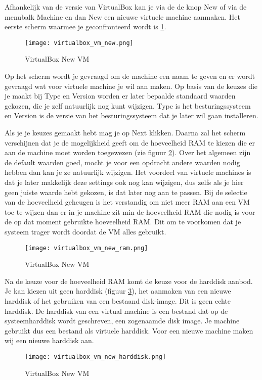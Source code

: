 Afhankelijk van de versie van VirtualBox kan je via de de knop New of via de menubalk Machine en dan New een nieuwe virtuele machine aanmaken. Het eerste scherm waarmee je geconfronteerd wordt is \ref{VB_New_VM}.
\begin{figure}[H]
	\centering
	\texttt{[image: virtualbox\_vm\_new.png]}
	\caption{VirtualBox New VM}
	\label{VB_New_VM}
\end{figure}
Op het scherm wordt je gevraagd om de machine een naam te geven en er wordt gevraagd wat voor virtuele machine je wil aan maken. Op basis van de keuzes die je maakt bij Type en Version worden er later bepaalde standaard waarden gekozen, die je zelf natuurlijk nog kunt wijzigen. Type is het besturingssysteem en Version is de versie van het besturingssysteem dat je later wil gaan installeren.

Als je je keuzes gemaakt hebt mag je op Next klikken. Daarna zal het scherm verschijnen dat je de mogelijkheid geeft om de hoeveelheid RAM te kiezen die er aan de machine moet worden toegewezen (zie figuur \ref{VB_New_VM_RAM}). Over het algemeen zijn de default waarden goed, mocht je voor een opdracht andere waarden nodig hebben dan kan je ze natuurlijk wijzigen. Het voordeel van virtuele machines is dat je later makkelijk deze settings ook nog kan wijzigen, dus zelfs als je hier geen juiste waarde hebt gekozen, is dat later nog aan te passen. Bij de selectie van de hoeveelheid geheugen is het verstandig om niet meer RAM aan een VM toe te wijzen dan er in je machine zit min de hoeveelheid RAM die nodig is voor de op dat moment gebruikte hoeveelheid RAM. Dit om te voorkomen dat je systeem trager wordt doordat de VM alles gebruikt.

\begin{figure}[H]
	\centering
	\texttt{[image: virtualbox\_vm\_new\_ram.png]}
	\caption{VirtualBox New VM}
	\label{VB_New_VM_RAM}
\end{figure}

Na de keuze voor de hoeveelheid RAM komt de keuze voor de harddisk aanbod. Je kan kiezen uit geen harddisk (figuur \ref{VB_New_VM_HD}), het aanmaken van een nieuwe harddisk of het gebruiken van een bestaand disk-image. Dit is geen echte harddisk. De harddisk van een virtual machine is een bestand dat op de systeemharddisk wordt geschreven, een zogenaamde disk image. Je machine gebruikt dus een bestand als virtuele harddisk. Voor een nieuwe machine maken wij een nieuwe harddisk aan.

\begin{figure}[H]
	\centering
	\texttt{[image: virtualbox\_vm\_new\_harddisk.png]}
	\caption{VirtualBox New VM}
	\label{VB_New_VM_HD}
\end{figure}

